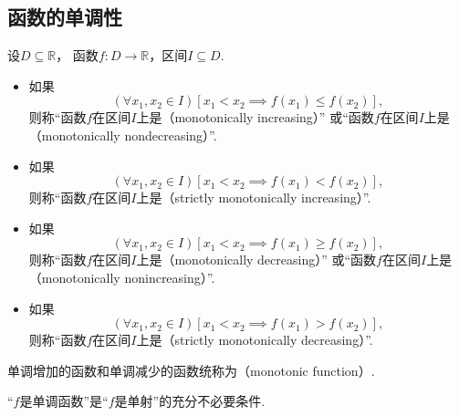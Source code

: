 \subsection{函数的单调性}
\begin{definition}\label{definition:函数的性质.单调性}
设\(D\subseteq\mathbb{R}\)，
函数\(f\colon D\to\mathbb{R}\)，区间\(I \subseteq D\).
\begin{itemize}
	\item 如果\begin{equation*}
		(\forall x_1,x_2\in I)
		[x_1 < x_2 \implies f(x_1) \leq f(x_2)],
	\end{equation*}
	则称“函数\(f\)在区间\(I\)上是（monotonically increasing）”
	或“函数\(f\)在区间\(I\)上是（monotonically nondecreasing）”.

	\item 如果\begin{equation*}
		(\forall x_1,x_2\in I)
		[x_1 < x_2 \implies f(x_1) < f(x_2)],
	\end{equation*}
	则称“函数\(f\)在区间\(I\)上是（strictly monotonically increasing）”.

	\item 如果\begin{equation*}
		(\forall x_1,x_2\in I)
		[x_1 < x_2 \implies f(x_1) \geq f(x_2)],
	\end{equation*}
	则称“函数\(f\)在区间\(I\)上是（monotonically decreasing）”
	或“函数\(f\)在区间\(I\)上是（monotonically nonincreasing）”.

	\item 如果\begin{equation*}
		(\forall x_1,x_2\in I)
		[x_1 < x_2 \implies f(x_1) > f(x_2)],
	\end{equation*}
	则称“函数\(f\)在区间\(I\)上是（strictly monotonically decreasing）”.
\end{itemize}

单调增加的函数和单调减少的函数统称为（monotonic function）.
\end{definition}

\begin{proposition}
“\(f\)是单调函数”是“\(f\)是单射”的充分不必要条件.
\end{proposition}

